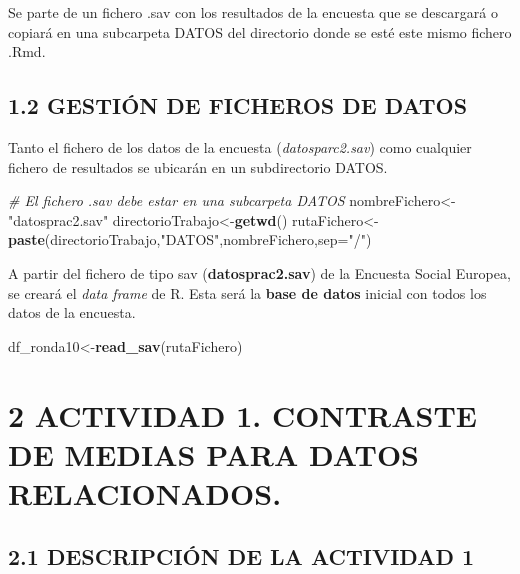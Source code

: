 \documentclass[
  12 pt,
  a4paper,
]{article}
\newenvironment{Shaded}{\begin{snugshade}}{\end{snugshade}}
\newcommand{\AttributeTok}[1]{\textcolor[rgb]{0.13,0.29,0.53}{#1}}
\newcommand{\CommentTok}[1]{\textcolor[rgb]{0.56,0.35,0.01}{\textit{#1}}}
\newcommand{\FunctionTok}[1]{\textcolor[rgb]{0.13,0.29,0.53}{\textbf{#1}}}
\newcommand{\NormalTok}[1]{#1}
\newcommand{\OtherTok}[1]{\textcolor[rgb]{0.56,0.35,0.01}{#1}}
\newcommand{\StringTok}[1]{\textcolor[rgb]{0.31,0.60,0.02}{#1}}
\begin{document}
Se parte de un fichero .sav con los resultados de la encuesta que se
descargará o copiará en una subcarpeta DATOS del directorio donde se
esté este mismo fichero .Rmd.

\subsection{1.2 GESTIÓN DE FICHEROS DE
DATOS}\label{gestiuxf3n-de-ficheros-de-datos}

Tanto el fichero de los datos de la encuesta (\emph{datosparc2.sav})
como cualquier fichero de resultados se ubicarán en un subdirectorio
DATOS.

\begin{Shaded}
\begin{Highlighting}[]
\CommentTok{\# El fichero .sav debe estar en una subcarpeta DATOS}
\NormalTok{nombreFichero}\OtherTok{\textless{}{-}}\StringTok{"datosprac2.sav"}
\NormalTok{directorioTrabajo}\OtherTok{\textless{}{-}}\FunctionTok{getwd}\NormalTok{()}
\NormalTok{rutaFichero}\OtherTok{\textless{}{-}}\FunctionTok{paste}\NormalTok{(directorioTrabajo,}\StringTok{"DATOS"}\NormalTok{,nombreFichero,}\AttributeTok{sep=}\StringTok{"/"}\NormalTok{)}
\end{Highlighting}
\end{Shaded}

A partir del fichero de tipo sav (\textbf{datosprac2.sav}) de la
Encuesta Social Europea, se creará el \emph{data frame} de R. Esta será
la \textbf{base de datos} inicial con todos los datos de la encuesta.

\begin{Shaded}
\begin{Highlighting}[]
\NormalTok{df\_ronda10}\OtherTok{\textless{}{-}}\FunctionTok{read\_sav}\NormalTok{(rutaFichero)}
\end{Highlighting}
\end{Shaded}

\section{2 ACTIVIDAD 1. CONTRASTE DE MEDIAS PARA DATOS
RELACIONADOS.}\label{actividad-1.-contraste-de-medias-para-datos-relacionados.}

\subsection{2.1 DESCRIPCIÓN DE LA ACTIVIDAD
1}\label{descripciuxf3n-de-la-actividad-1}
\end{document}
